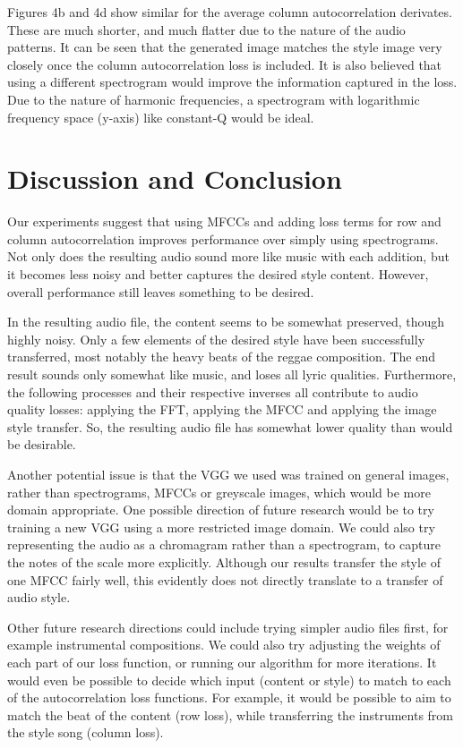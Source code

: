 \documentclass{article}
\begin{document}
Figures 4b and 4d show similar for the average column autocorrelation derivates. These are much shorter, and much flatter due to the nature of the audio patterns. It can be seen that the generated image matches the style image very closely once the column autocorrelation loss is included. It is also believed that using a different spectrogram would improve the information captured in the loss. Due to the nature of harmonic frequencies, a spectrogram with logarithmic frequency space (y-axis) like constant-Q would be ideal.

\section{Discussion and Conclusion}

Our experiments suggest that using MFCCs and adding loss terms for row and column autocorrelation improves performance over simply using spectrograms. Not only does the resulting audio sound more like music with each addition, but it becomes less noisy and better captures the desired style content. However, overall performance still leaves something to be desired.

In the resulting audio file, the content seems to be somewhat preserved, though highly noisy. Only a few elements of the desired style have been successfully transferred, most notably the heavy beats of the reggae composition. The end result sounds only somewhat like music, and loses all lyric qualities. Furthermore, the following processes and their respective inverses all contribute to audio quality losses: applying the FFT, applying the MFCC and applying the image style transfer. So, the resulting audio file has somewhat lower quality than would be desirable.

Another potential issue is that the VGG we used was trained on general images, rather than spectrograms, MFCCs or greyscale images, which would be more domain appropriate. One possible direction of future research would be to try training a new VGG using a more restricted image domain. We could also try representing the audio as a chromagram rather than a spectrogram, to capture the notes of the scale more explicitly. Although our results transfer the style of one MFCC fairly well, this evidently does not directly translate to a transfer of audio style.

Other future research directions could include trying simpler audio files first, for example instrumental compositions. We could also try adjusting the weights of each part of our loss function, or running our algorithm for more iterations. It would even be possible to decide which input (content or style) to match to each of the autocorrelation loss functions.  For example, it would be possible to aim to match the beat of the content (row loss), while transferring the instruments from the style song (column loss).
\end{document}
